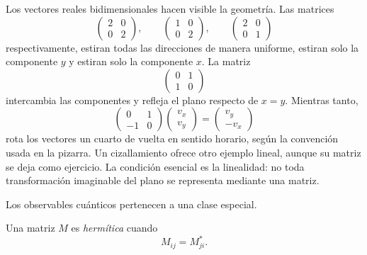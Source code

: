 Los vectores reales bidimensionales hacen visible la geometría. Las matrices
\begin{equation}
  \begin{pmatrix}2&0\\0&2\end{pmatrix},
  \qquad
  \begin{pmatrix}1&0\\0&2\end{pmatrix},
  \qquad
  \begin{pmatrix}2&0\\0&1\end{pmatrix}
\end{equation}
respectivamente, estiran todas las direcciones de manera uniforme, estiran solo la componente \(y\) y estiran solo la componente \(x\). La matriz
\begin{equation}
  \begin{pmatrix}0&1\\1&0\end{pmatrix}
\end{equation}
intercambia las componentes y refleja el plano respecto de \(x=y\). Mientras tanto,
\begin{equation}
  \begin{pmatrix}0&1\\-1&0\end{pmatrix}
  \begin{pmatrix}v_x\\v_y\end{pmatrix}
  =
  \begin{pmatrix}v_y\\-v_x\end{pmatrix}
  \label{eq:l02-quarter-turn}
\end{equation}
rota los vectores un cuarto de vuelta en sentido horario, según la convención usada en la pizarra. Un cizallamiento ofrece otro ejemplo lineal, aunque su matriz se deja como ejercicio. La condición esencial es la linealidad: no toda transformación imaginable del plano se representa mediante una matriz.

Los observables cuánticos pertenecen a una clase especial.

\begin{definition}
Una matriz \(M\) es \emph{hermítica} cuando
\begin{equation}
  M_{ij}=M_{ji}^*.
  \label{eq:l02-hermitian-condition}
\end{equation}
\end{definition}

